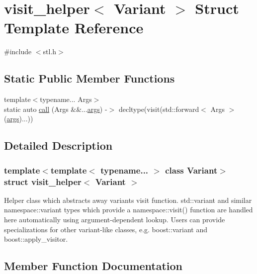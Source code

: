\hypertarget{structvisit__helper}{}\section{visit\+\_\+helper$<$ Variant $>$ Struct Template Reference}
\label{structvisit__helper}


{\ttfamily \#include $<$stl.\+h$>$}

\subsection*{Static Public Member Functions}
\begin{DoxyCompactItemize}
\item 
{\footnotesize template$<$typename... Args$>$ }\\static auto \mbox{\hyperlink{structvisit__helper_a473267b48de4dd59210914d9d70ea577}{call}} (Args \&\&...\mbox{\hyperlink{classargs}{args}}) -\/$>$ decltype(visit(std\+::forward$<$ Args $>$(\mbox{\hyperlink{classargs}{args}})...))
\end{DoxyCompactItemize}


\subsection{Detailed Description}
\subsubsection*{template$<$template$<$ typename... $>$ class Variant$>$\newline
struct visit\+\_\+helper$<$ Variant $>$}

Helper class which abstracts away variant\textquotesingle{}s {\ttfamily visit} function. {\ttfamily std\+::variant} and similar {\ttfamily namespace\+::variant} types which provide a {\ttfamily namespace\+::visit()} function are handled here automatically using argument-\/dependent lookup. Users can provide specializations for other variant-\/like classes, e.\+g. {\ttfamily boost\+::variant} and {\ttfamily boost\+::apply\+\_\+visitor}. 

\subsection{Member Function Documentation}
\mbox{\label{structvisit__helper_a473267b48de4dd59210914d9d70ea577}} 
